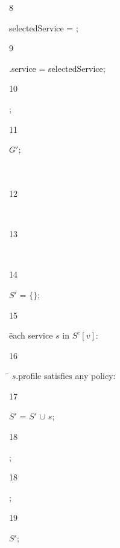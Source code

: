\begin{ourcolor}
\begin{tabbing}
      \begin{redtext}8\end{redtext}\tabone selectedService = ;\\
      \begin{redtext}9\end{redtext}\tabone \vii{}.service = selectedService;\\
      \begin{redtext}10\end{redtext};\\
      \begin{redtext}11\end{redtext} $G'$;\\
      \\
      \\
      \begin{redtext}12\end{redtext}\\
      \begin{redtext}13\end{redtext}\\
      \begin{redtext}14\end{redtext}$S'$ = $\{\}$;\\
      \begin{redtext}15\end{redtext} \= each service $s$ in $S^c[v]$:\\
      \begin{redtext}16\end{redtext}\tabone {} \= $s$.profile satisfies any policy:\\
      \begin{redtext}17\end{redtext}\tabtwo $S'$ = $S'$ $\cup$ $s$;\\
      \begin{redtext}18\end{redtext}\tabone{};\\
      \begin{redtext}18\end{redtext};\\
      \begin{redtext}19\end{redtext} $S'$;\\

\end{tabbing}
\end{ourcolor}
